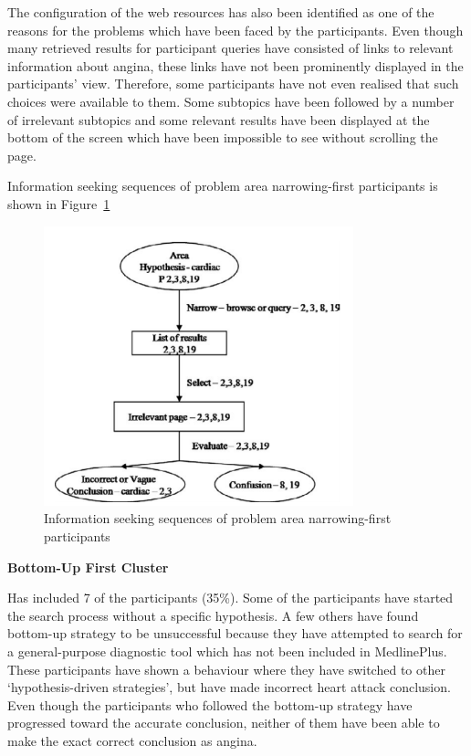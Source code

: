 \documentclass[]{article}
\begin{document}
The configuration of the web resources has also been identified as one of the reasons for the problems which have been faced by the participants. Even though many retrieved results for participant queries have consisted of links to relevant information about angina, these links have not been prominently displayed in the participants’ view. Therefore, some participants have not even realised that such choices were available to them. Some subtopics have been followed by a number of irrelevant subtopics and some relevant results have been displayed at the bottom of the screen which have been impossible to see without scrolling the page.   
  
Information seeking sequences of problem area narrowing-first participants is shown in Figure~\ref{fig12}

\begin{figure}[t!]
	\includegraphics[width=0.8\textwidth]{Capture12.png}
	\caption{Information seeking sequences of problem area narrowing-first participants\label{fig12}}
\end{figure}

\textbf{Bottom-Up First Cluster}

Has included 7 of the participants (35\%). Some of the participants have started the search process without a specific hypothesis. A few others have found bottom-up strategy to be unsuccessful because they have attempted to search for a general-purpose diagnostic tool which has not been included in MedlinePlus. These participants have shown a behaviour where they have switched to other ‘hypothesis-driven strategies’, but have made incorrect heart attack conclusion. Even though the participants who followed the bottom-up strategy have progressed toward the accurate conclusion, neither of them have been able to make the exact correct conclusion as angina.  
\end{document}
